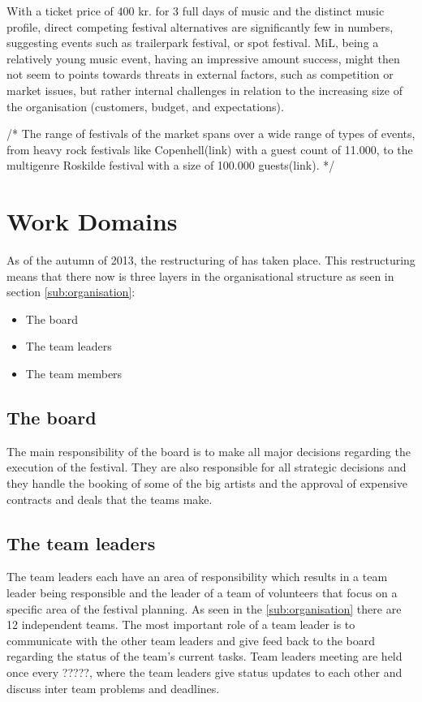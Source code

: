 \bigskip

With a ticket price of 400 kr. for 3 full days of music and the distinct music profile, direct competing festival alternatives are significantly few in numbers, suggesting events such as trailerpark festival, or spot festival. MiL, being a relatively young music event, having an impressive amount success, might then not seem to points towards threats in external factors, such as competition or market issues, but rather internal challenges in relation to the increasing size of the organisation (customers, budget, and expectations). 

\bigskip

/*
The range of festivals of the market spans over a wide range of types of events, from heavy rock festivals like Copenhell(link) with a guest count of 11.000, to the multigenre Roskilde festival with a size of 100.000 guests(link). 
*/


\section{Work Domains}
\label{sec:work_domains}
As of the autumn of 2013, the restructuring of \mil has taken place. This restructuring means
that there now is three layers in the organisational structure as seen in section
\ref{sub:organisation}:
\begin{itemize}
    \item The board
    \item The team leaders
    \item The team members
\end{itemize}
\subsection{The board}
\label{sub:the_board}
The main responsibility of the board is to make all major decisions regarding the execution of the
festival. They are also responsible for all strategic decisions and they handle the booking of
some of the big artists and the approval of expensive contracts and deals that the teams make.

\subsection{The team leaders}
\label{sub:team_leaders}
The team leaders each have an area of responsibility which results in a team leader being
responsible and the leader of a team of volunteers that focus on a specific area of the festival
planning. As seen in the \ref{sub:organisation} there are 12 independent teams. The most important
role of a team leader is to communicate with the other team leaders and give feed back to the board
regarding the status of the team's current tasks. Team leaders meeting are held once every ?????,
where the team leaders give status updates to each other and discuss inter team problems and
deadlines.

